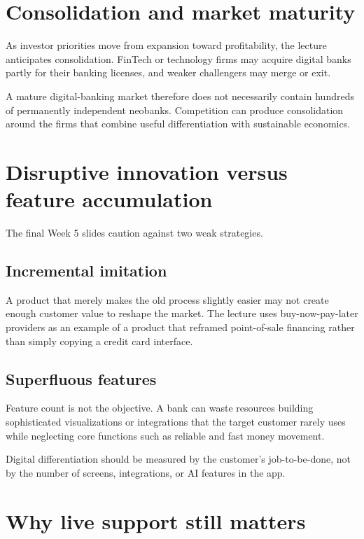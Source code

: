 \section{Consolidation and market maturity}

As investor priorities move from expansion toward profitability, the lecture anticipates consolidation. FinTech or technology firms may acquire digital banks partly for their banking licenses, and weaker challengers may merge or exit.

A mature digital-banking market therefore does not necessarily contain hundreds of permanently independent neobanks. Competition can produce consolidation around the firms that combine useful differentiation with sustainable economics.

\section{Disruptive innovation versus feature accumulation}

The final Week 5 slides caution against two weak strategies.

\subsection{Incremental imitation}

A product that merely makes the old process slightly easier may not create enough customer value to reshape the market. The lecture uses buy-now-pay-later providers as an example of a product that reframed point-of-sale financing rather than simply copying a credit card interface.

\subsection{Superfluous features}

Feature count is not the objective. A bank can waste resources building sophisticated visualizations or integrations that the target customer rarely uses while neglecting core functions such as reliable and fast money movement.

\begin{keyidea}
Digital differentiation should be measured by the customer's job-to-be-done, not by the number of screens, integrations, or AI features in the app.
\end{keyidea}

\section{Why live support still matters}

